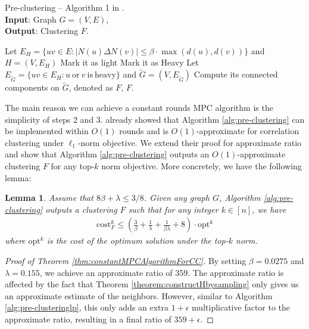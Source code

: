 \documentclass[11pt]{article}
\newcommand{\cost}{\mathrm{cost}}
\newtheorem{lemma}[theorem]{Lemma}
\newcommand{\opt}{{\mathrm{opt}}}
\begin{document}
\begin{CJK*}{UTF8}{gbsn}
\begin{algorithm}[ht!]
\caption{Pre-clustering – Algorithm 1 in \cite{cohen2021correlation}. \\
\textbf{Input}: Graph $G = (V, E)$, \\
\textbf{Output}: Clustering $F$.}
\label{alg:pre-clustering}
\begin{algorithmic}[1]
 \State Let $E_H = \{uv \in E: |N(u) \Delta N(v)| \leq \beta \cdot \max(d(u), d(v))\}$ and $H = (V, E_H)$
 \label{alg:pre-clusteringfirst}
 \label{alg:pre-clusteringsecondstart}
 Mark it as light
\Else \quad Mark it as Heavy
\EndIf
\EndFor  
\State Let $E_{\tilde{G}} = \{ uv \in E_H: u \mathrm{\ or\ } v \mathrm{\ is\ heavy} \}$ and $\tilde{G} = (V, E_{\tilde{G}})$ \label{alg:pre-clusteringsecondend}
\State Compute its connected components on $\tilde{G}$, denoted as $F$,
\Return $F$.
\EndFunction
    \end{algorithmic}    
\end{algorithm}

The main reason we can achieve a constant rounds MPC algorithm is the simplicity of steps 2 and 3. \cite{cohen2021correlation} already showed that Algorithm \ref{alg:pre-clustering} can be implemented within $O(1)$ rounds and is $O(1)$-approximate for correlation clustering under $\ell_1$-norm objective. We extend their proof for approximate ratio and show that Algorithm \ref{alg:pre-clustering} outputs an $O(1)$-approximate clustering $F$ for any top-$k$ norm objective. More concretely, we have the following lemma:

\begin{lemma}
\label{lemma:preclusteringratio}
Assume that $8\beta + \lambda \leq 3/8$. Given any graph $G$, Algorithm \ref{alg:pre-clustering} outputs a clustering $F$ such that for any integer $k \in [n]$, we have 
\begin{align*}
    \cost^k_{F} \leq \left(\frac{3}{\beta} + \frac{1}{\lambda} + \frac{1}{\beta\lambda} + 8\right) \cdot \opt^k
\end{align*}
where $\opt^k$ is the cost of the optimum solution under the top-$k$ norm.
\end{lemma}

\begin{proof}[Proof of Theorem \ref{thm:constantMPCAlgorithmForCC}]
By setting $\beta = 0.0275$ and $\lambda = 0.155$, we achieve an approximate ratio of 359. The approximate ratio is affected by the fact that Theorem \ref{theorem:constructHbysampling} only gives us an approximate estimate of the neighbors. However, similar to Algorithm \ref{alg:pre-clusteringlp}, this only adds an extra $1 + \epsilon$ multiplicative factor to the approximate ratio, resulting in a final ratio of $359 + \epsilon$.


\end{proof}
\end{CJK*}
\end{document}
